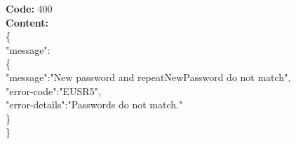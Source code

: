 \begin{itemize}
        
        \textbf{Code:} 400\\
        \textbf{Content:}\\
        \{\\
         \tab "message":\\
         \tab \{\\
         \tab \tab "message":"New password and repeatNewPassword do not match",\\
         \tab \tab "error-code":"EUSR5",\\
         \tab \tab "error-details":"Passwords do not match."\\
         \tab \}\\
        \}\\

\end{itemize}    


\begin{comment}
    \begin{itemize}
        \item URL: \texttt{the URL to retrieve it}
        \item Method: \texttt{Method to retrieve it}
        \item URL Parameters:
        \item Data Parameters: 
        \item Success Response:
        \item Error Response:
        
    \end{itemize}
\end{comment}

